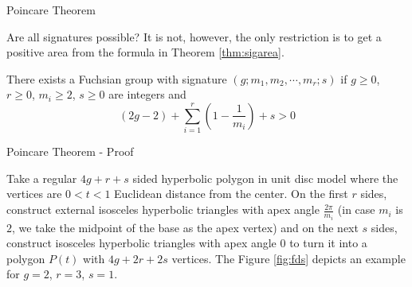 \documentclass[
	american,
	sections numbered,
	usenames,
	xcolor=dvipsnames,
	aspectratio=169,
]{beamer}
\theoremstyle{plain}%
\begin{document}
\begin{frame}{Poincare Theorem}

	Are all signatures possible? It is not, however, the only restriction is to get a positive area from the formula in Theorem \ref{thm:sigarea}.

    \begin{theorem}[Poincare]\label<1>{thm:poincare}
        There exists a Fuchsian group with signature $(g;m_1,m_2,\cdots,m_r;s)$ if $g\geq 0$, $r\geq 0$, $m_i\geq 2$, $s\geq 0$ are integers and $$(2g-2)+\sum_{i=1}^r\left(1-\frac{1}{m_i}\right)+s>0$$
    \end{theorem}

\end{frame}

\begin{frame}{Poincare Theorem - Proof}

	Take a regular $4g+r+s$ sided hyperbolic polygon in unit disc model where the vertices are $0<t<1$ Euclidean distance from the center. On the first $r$ sides, construct external isosceles hyperbolic triangles with apex angle $\frac{2\pi}{m_i}$ (in case $m_i$ is $2$, we take the midpoint of the base as the apex vertex) and on the next $s$ sides, construct isosceles hyperbolic triangles with apex angle $0$ to turn it into a polygon $P(t)$ with $4g+2r+2s$ vertices. The Figure \ref{fig:fds} depicts an example for $g=2$, $r=3$, $s=1$.

\end{frame}
\end{document}
